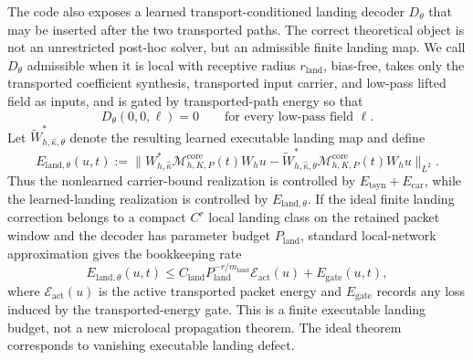 The code also exposes a learned transport-conditioned landing decoder $D_\theta$ that may be inserted after the two transported paths.  The correct theoretical object is not an unrestricted post-hoc solver, but an admissible finite landing map.  We call $D_\theta$ admissible when it is local with receptive radius $r_{\mathrm{land}}$, bias-free, takes only the transported coefficient synthesis, transported input carrier, and low-pass lifted field as inputs, and is gated by transported-path energy so that
\[
D_\theta(0,0,\ell)=0
\qquad\text{for every low-pass field }\ell .
\]
Let $\widetilde W_{h,\widehat\kappa,\theta}^{\ast}$ denote the resulting learned executable landing map and define
\[
E_{\mathrm{land},\theta}(u,t)
:=
\bigl\|
W_{h,\widehat\kappa}^{\ast}\mathcal M_{h,K,P}^{\mathrm{core}}(t)W_hu
-
\widetilde W_{h,\widehat\kappa,\theta}^{\ast}\mathcal M_{h,K,P}^{\mathrm{core}}(t)W_hu
\bigr\|_{L^2}.
\]
Thus the nonlearned carrier-bound realization is controlled by $E_{\mathrm{tsyn}}+E_{\mathrm{car}}$, while the learned-landing realization is controlled by $E_{\mathrm{land},\theta}$.  If the ideal finite landing correction belongs to a compact $C^r$ local landing class on the retained packet window and the decoder has parameter budget $P_{\mathrm{land}}$, standard local-network approximation gives the bookkeeping rate
\[
E_{\mathrm{land},\theta}(u,t)
\le
C_{\mathrm{land}}P_{\mathrm{land}}^{-r/m_{\mathrm{land}}}\mathcal E_{\mathrm{act}}(u)
+E_{\mathrm{gate}}(u,t),
\]
where $\mathcal E_{\mathrm{act}}(u)$ is the active transported packet energy and $E_{\mathrm{gate}}$ records any loss induced by the transported-energy gate.  This is a finite executable landing budget, not a new microlocal propagation theorem.  The ideal theorem corresponds to vanishing executable landing defect.

